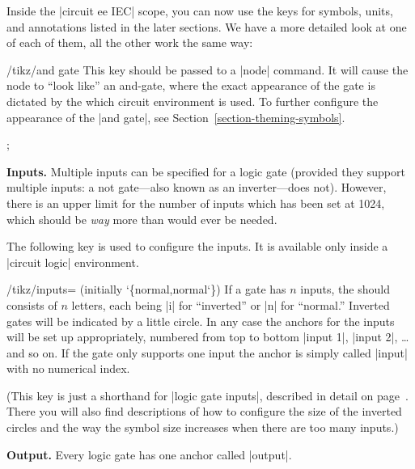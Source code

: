 Inside the |circuit ee IEC| scope, you can now use the keys for
symbols, units, and annotations listed in the later sections. We have
a more detailed look at one of each of them, all the other work the
same way: 

\begin{key}{/tikz/and gate}
  This key should be passed to a |node| command. It will cause the
  node to ``look like'' an and-gate, where the exact appearance of the
  gate is dictated by the which circuit environment is used.   To
  further configure the appearance of the |and gate|, see 
  Section~\ref{section-theming-symbols}.

\begin{codeexample}[]
 ;    
\end{codeexample}
\begin{codeexample}[]
\end{codeexample}

  \medskip\textbf{Inputs.}
  Multiple inputs can be specified for a logic gate (provided they
  support multiple inputs: a not gate---also known as an
  inverter---does not). However, there is an upper limit for the
  number of inputs which has been set at 1024, which should be \emph{way} 
  more than would ever be needed.

  The following key is used to configure the inputs. It is available
  only inside a |circuit logic| environment.
 
  \begin{key}{/tikz/inputs= (initially \char`\{normal,normal\char`\})}
    If a gate has $n$ inputs, the  should consists of
    $n$ letters, each being |i| for ``inverted'' or |n| for
    ``normal.'' Inverted gates will be indicated by a little
    circle. In any case the anchors for the inputs will be set  
    up appropriately, numbered from top to bottom |input 1|, |input 2|,
    \ldots and so on. If the gate only supports one input the anchor
    is simply called |input| with no numerical index.
\begin{codeexample}[]
\end{codeexample} 
  \end{key}

  (This key is just a shorthand for |logic gate inputs|, described
  in detail on page~\pageref{logic-gate-inputs}. There you will also
  find descriptions of how to configure the size of the inverted
  circles and the way the symbol size increases when there are too
  many inputs.)
  
  \textbf{Output.}
  Every logic gate has one anchor called |output|.
\end{key}


